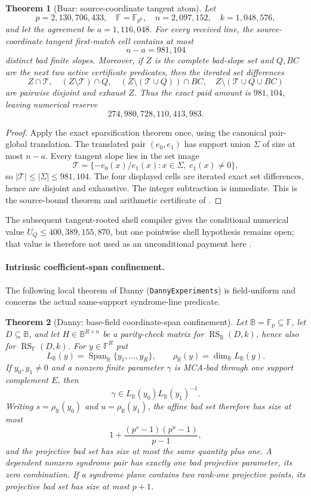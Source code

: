 \documentclass[11pt,a4paper]{amsart}
\numberwithin{equation}{section}
\newtheorem{theorem}{Theorem}[section]
\theoremstyle{remark}
\DeclareMathOperator{\RS}{RS}
\DeclareMathOperator{\Span}{Span}
\newcommand{\F}{\mathbb F}
\newcommand{\B}{\mathbb B}
\begin{document}
\begin{theorem}[Buar: source-coordinate tangent atom]\label{thm:kb-tangent-atom}
Let
\[
 p=2{,}130{,}706{,}433,\quad \F=\mathbb F_{p^6},\quad
 n=2{,}097{,}152,\quad k=1{,}048{,}576,
\]
and let the agreement be $a=1{,}116{,}048$.  For every received line, the source-coordinate tangent first-match cell contains at most
\[
 n-a=981{,}104
\]
distinct bad finite slopes.  Moreover, if $Z$ is the complete bad-slope set and $Q,BC$ are the next two active certificate predicates, then the iterated set differences
\[
 Z\cap\mathcal T,\quad (Z\setminus\mathcal T)\cap Q,\quad
 (Z\setminus(\mathcal T\cup Q))\cap BC,\quad
 Z\setminus(\mathcal T\cup Q\cup BC)
\]
are pairwise disjoint and exhaust $Z$.  Thus the exact paid amount is $981{,}104$, leaving numerical reserve
\[
 274{,}980{,}728{,}110{,}413{,}983.
\]
\end{theorem}

\begin{proof}
Apply the exact sparsification theorem once, using the canonical pair-global translation.  The translated pair $(e_0,e_1)$ has support union $\Sigma$ of size at most $n-a$.  Every tangent slope lies in the set image
\[
 \mathcal T=\{-e_0(x)/e_1(x):x\in\Sigma,\ e_1(x)\ne0\},
\]
so $|\mathcal T|\le|\Sigma|\le981{,}104$.  The four displayed cells are iterated exact set differences, hence are disjoint and exhaustive.  The integer subtraction is immediate.  This is the source-bound theorem and arithmetic certificate of \cite{BuarKBTangent26}.
\end{proof}

The subsequent tangent-rooted shell compiler gives the conditional numerical value $U_Q\le400{,}389{,}155{,}870$, but one pointwise shell hypothesis remains open; that value is therefore not used as an unconditional payment here \cite{BuarKBQ26}.

\paragraph{Intrinsic coefficient-span confinement.}
The following local theorem of Danny (\texttt{DannyExperiments}) is field-uniform and concerns the actual same-support syndrome-line predicate.

\begin{theorem}[Danny: base-field coordinate-span confinement]\label{thm:coordinate-span}
Let $\B=\mathbb F_p\subseteq\F$, let $D\subseteq\B$, and let $H\in\B^{R\times n}$ be a parity-check matrix for $\RS_{\B}(D,k)$, hence also for $\RS_{\F}(D,k)$.  For $y\in\F^R$ put
\[
 L_{\B}(y)=\Span_{\B}\{y_1,\ldots,y_R\},\qquad
 \rho_{\B}(y)=\dim_{\B}L_{\B}(y).
\]
If $y_0,y_1\ne0$ and a nonzero finite parameter $\gamma$ is MCA-bad through one support complement $E$, then
\[
 \gamma\in L_{\B}(y_0)L_{\B}(y_1)^{-1}.
\]
Writing $s=\rho_{\B}(y_0)$ and $u=\rho_{\B}(y_1)$, the affine bad set therefore has size at most
\[
 1+\frac{(p^s-1)(p^u-1)}{p-1},
\]
and the projective bad set has size at most the same quantity plus one.  A dependent nonzero syndrome pair has exactly one bad projective parameter, its zero combination.  If a syndrome plane contains two rank-one projective points, its projective bad set has size at most $p+1$.
\end{theorem}
\end{document}
